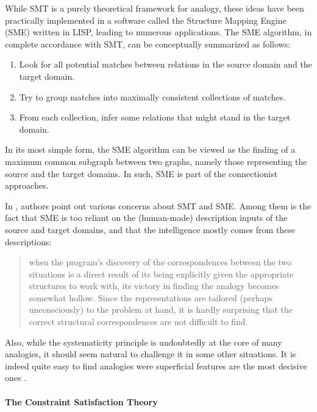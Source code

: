 While SMT is a purely theoretical framework for analogy, these ideas have been
practically implemented in a software called the Structure Mapping Engine (SME)
\cite{FalForKenGen89} written in LISP, leading to numerous
applications. The SME algorithm, in complete accordance with SMT,
can be conceptually summarized as follows:
\begin{enumerate}
    \item Look for all potential matches between relations in the source domain
      and the target domain.
    \item Try to group matches into maximally consistent collections of
      matches.
    \item From each collection, infer some relations that might stand in the
      target domain.
\end{enumerate}
In its most simple form, the SME algorithm can be viewed as the finding of a
maximum common subgraph between two graphs, namely those representing the
source and the target domains. In such, SME is part of the connectionist
approaches.

In  \cite{ChaFreHof92}, authors point out various concerns about SMT and SME.
Among them is the fact that SME is too reliant on the (human-made) description
inputs of the source and target domains, and that the intelligence mostly comes
from these descriptions:

\begin{quote}
  when the program’s discovery of the correspondences between the two situations
  is a direct result of its being explicitly given the appropriate structures
  to work with, its victory in finding the analogy becomes somewhat hollow.
  Since the representations are tailored (perhaps unconsciously) to the problem
  at hand, it is hardly surprising that the correct structural correspondences
  are not difficult to find.
\end{quote}

Also, while the systematicity principle is undoubtedly at the core of many
analogies, it should seem natural to challenge it in some other situations. It
is indeed quite easy to find analogies were superficial features are the most
decisive ones \cite{Bar10}.

\paragraph{The Constraint Satisfaction Theory\\}

